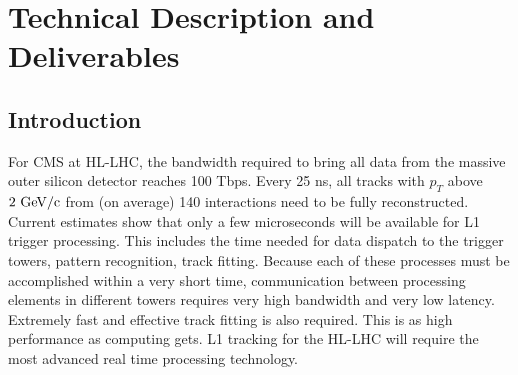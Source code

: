 \section{Technical Description and Deliverables}

\subsection{Introduction}


\noindent 

For CMS at HL-LHC, the bandwidth required to bring all data from the massive outer silicon detector reaches 100 Tbps.  Every 25 ns, all tracks with $p_{T}$ above $2\rm~GeV/c$ from (on average) 140 interactions need to be fully reconstructed.
Current estimates show that only a few microseconds will be available for L1 trigger processing.  This includes the time needed for data dispatch to the trigger towers, pattern recognition, track fitting.  Because each of these processes must be accomplished within a very short time, communication between processing elements in different towers requires very high bandwidth and very low latency. Extremely fast and effective track fitting is also required.  This is as high performance as computing gets.  L1 tracking for the HL-LHC will require the most advanced real time processing technology.



